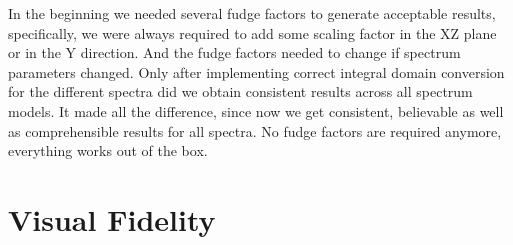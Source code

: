 In the beginning we needed several fudge factors to generate acceptable results,
specifically, we were always required to add some scaling factor in the XZ plane
or in the Y direction. And the fudge factors needed to change if spectrum
parameters changed.
Only after implementing correct integral domain conversion for the different
spectra did we obtain consistent results across all spectrum models. It made all
the difference, since now we get consistent, believable as well as
comprehensible results for all spectra. No fudge factors are required anymore,
everything works out of the box.

\section{Visual Fidelity}
\label{sec:results:fidelity}
%
\begin{figure}
\centering
 \hfill
 \hfill
 \hfill
\end{figure}
